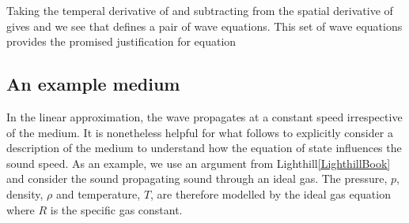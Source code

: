 Taking the temperal derivative of  and subtracting from the spatial derivative of
gives
and we see that  defines a pair of wave equations.
This set of wave equations provides the promised justification for equation 

\subsection{An example medium}
In the linear approximation, the wave propagates at a constant speed irrespective of the medium.
It is nonetheless helpful for what follows to explicitly consider a description of the medium
to understand how the equation of state influences the sound speed.
As an example, we use an argument from Lighthill\ref{LighthillBook}
and consider the sound propagating sound through an ideal gas.
The pressure, $p$, density, $\rho$ and temperature, $T$, are therefore modelled by the ideal gas equation
where $R$ is the specific gas constant.


